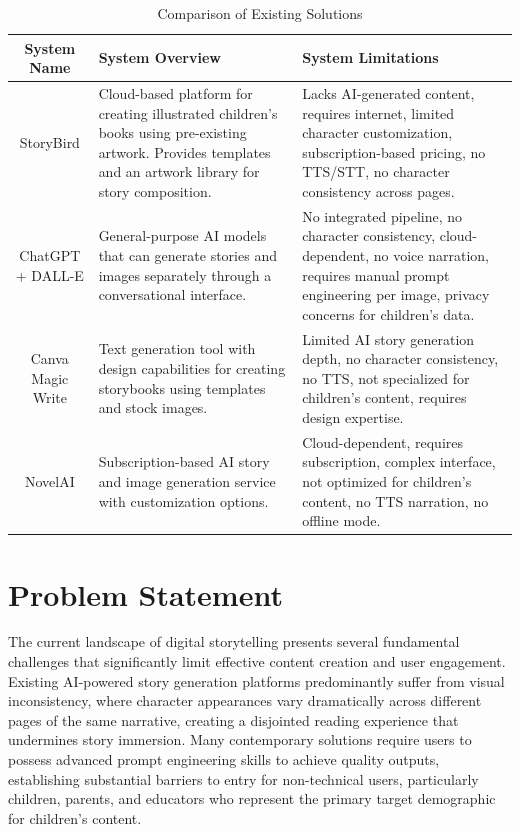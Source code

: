 \begin{table}[H]
\centering
\caption{Comparison of Existing Solutions}
\begin{tabular}{|c|p{5cm}|p{5cm}|}
\hline
\textbf{System Name} & \textbf{System Overview} & \textbf{System Limitations} \\ \hline
StoryBird & Cloud-based platform for creating illustrated children's books using pre-existing artwork. Provides templates and an artwork library for story composition. & Lacks AI-generated content, requires internet, limited character customization, subscription-based pricing, no TTS/STT, no character consistency across pages. \\ \hline
ChatGPT + DALL-E & General-purpose AI models that can generate stories and images separately through a conversational interface. & No integrated pipeline, no character consistency, cloud-dependent, no voice narration, requires manual prompt engineering per image, privacy concerns for children's data. \\ \hline
Canva Magic Write & Text generation tool with design capabilities for creating storybooks using templates and stock images. & Limited AI story generation depth, no character consistency, no TTS, not specialized for children's content, requires design expertise. \\ \hline
NovelAI & Subscription-based AI story and image generation service with customization options. & Cloud-dependent, requires subscription, complex interface, not optimized for children's content, no TTS narration, no offline mode. \\ \hline
\end{tabular}
\label{tab:system_comparison}
\end{table}


\section{Problem Statement}

The current landscape of digital storytelling presents several fundamental challenges that significantly limit effective content creation and user engagement. Existing AI-powered story generation platforms predominantly suffer from visual inconsistency, where character appearances vary dramatically across different pages of the same narrative, creating a disjointed reading experience that undermines story immersion. Many contemporary solutions require users to possess advanced prompt engineering skills to achieve quality outputs, establishing substantial barriers to entry for non-technical users, particularly children, parents, and educators who represent the primary target demographic for children's content.

